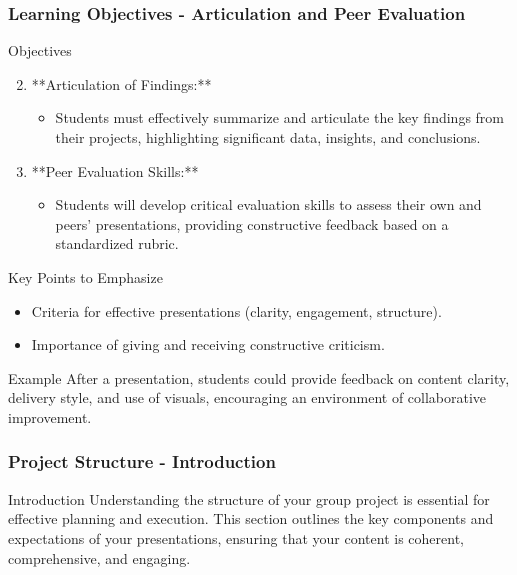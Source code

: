 \documentclass{beamer}
\begin{document}
\begin{frame}[fragile]
    \frametitle{Learning Objectives - Articulation and Peer Evaluation}
    \begin{block}{Objectives}
        \begin{enumerate}
            \setcounter{enumi}{1} %
            \item **Articulation of Findings:**
            \begin{itemize}
                \item Students must effectively summarize and articulate the key findings from their projects, highlighting significant data, insights, and conclusions.
            \end{itemize}
            \item **Peer Evaluation Skills:**
            \begin{itemize}
                \item Students will develop critical evaluation skills to assess their own and peers' presentations, providing constructive feedback based on a standardized rubric.
            \end{itemize}
        \end{enumerate}
    \end{block}

    \begin{block}{Key Points to Emphasize}
        \begin{itemize}
            \item Criteria for effective presentations (clarity, engagement, structure).
            \item Importance of giving and receiving constructive criticism.
        \end{itemize}
    \end{block}

    \begin{block}{Example}
        After a presentation, students could provide feedback on content clarity, delivery style, and use of visuals, encouraging an environment of collaborative improvement.
    \end{block}
\end{frame}

\begin{frame}[fragile]
    \frametitle{Project Structure - Introduction}
    \begin{block}{Introduction}
        Understanding the structure of your group project is essential for effective planning and execution. This section outlines the key components and expectations of your presentations, ensuring that your content is coherent, comprehensive, and engaging.
    \end{block}
\end{frame}
\end{document}
